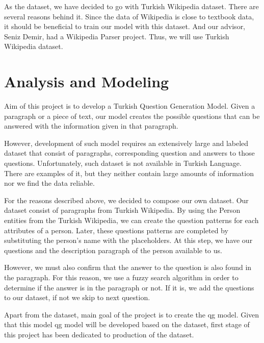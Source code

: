 \documentclass{mefsdp}
\begin{document}
	As the dataset, we have decided to go with Turkish Wikipedia dataset. There are several reasons behind it. Since the data of Wikipedia is close to textbook data, it should be beneficial to train our model with this dataset. And our advisor, Seniz Demir, had a Wikipedia Parser project. Thus, we will use Turkish Wikipedia dataset.
	
	
	
	\section{Analysis and Modeling}
	
	Aim of this project is to develop a Turkish Question Generation Model. Given a paragraph or a piece of text, our model creates the possible questions that can be answered with the information given in that paragraph. \newline \par
	
	However, development of such model requires an extensively large and labeled dataset that consist of paragraphs, corresponding question and answers to those questions. Unfortunately, such dataset is not available in Turkish Language. There are examples of it, but they neither contain large amounts of information nor we find the data reliable. \newline \par
	
	For the reasons described above, we decided to compose our own dataset. Our dataset consist of paragraphs from Turkish Wikipedia. By using the Person entities from the Turkish Wikipedia, we can create the question patterns for each attributes of a person. Later, these questions patterns are completed by substituting the person's name with the placeholders. At this step, we have our questions and the description paragraph of the person available to us.
	
	However, we must also confirm that the answer to the question is also found in the paragraph. For this reason, we use a fuzzy search algorithm in order to determine if the answer is in the paragraph or not. If it is, we add the questions to our dataset, if not we skip to next question. \newline \par
	
	Apart from the dataset, main goal of the project is to create the \gls{qg} model. Given that this model \gls{qg} model will be developed based on the dataset, first stage of this project has been dedicated to production of the dataset. 
	
\end{document}
